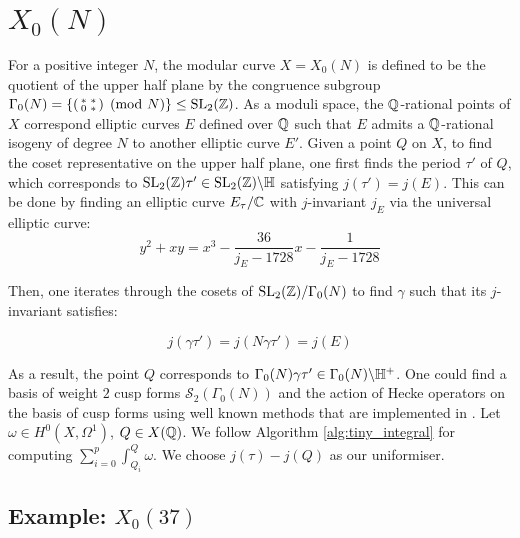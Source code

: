 \section{$X_0(N)$}\label{sec:X_0_N}

For a positive integer $N$, the modular curve $X = X_0(N)$ is defined to be the quotient of the upper half plane by the congruence subgroup $\Gamma_0(N) = \{ \begin{psmallmatrix} \ast & \ast \\ 0 & \ast \end{psmallmatrix} \pmod{N} \} \leq \operatorname{SL}_2(\mathbb{Z})$. As a moduli space, the $\mathbb{Q}$-rational points of $X$ correspond elliptic curves $E$ defined over $\mathbb{Q}$ such that $E$ admits a $\mathbb{Q}$-rational isogeny of degree $N$ to another elliptic curve $E'$. Given a point $Q$ on $X$, to find the coset representative on the upper half plane, one first finds the period $\tau'$ of $Q$, which corresponds to $\operatorname{SL}_2(\mathbb{Z}) \tau' \in \operatorname{SL}_2(\mathbb{Z})\backslash \mathbb{H}$ satisfying $j(\tau') = j(E)$. This can be done by finding an elliptic curve $E_{\tau}/\mathbb{C}$ with $j$-invariant $j_E$ via the universal elliptic curve: \[
y^2 + xy = x^3 - \frac{36}{j_E -1728}x - \frac{1}{j_E - 1728}
\]

Then, one iterates through the cosets of $\operatorname{SL}_2(\mathbb{Z})/\Gamma_0(N)$ to find $\gamma$ such that its $j$-invariant satisfies:

\[
j(\gamma \tau') = j( N\gamma \tau') = j(E)
\]

As a result, the point $Q$ corresponds to $\Gamma_0(N) \gamma \tau' \in \Gamma_0(N) \backslash \mathbb{H}^+$. One could find a basis of weight $2$ cusp forms $\mathcal{S}_2(\Gamma_0(N))$ and the action of Hecke operators on the basis of cusp forms using well known methods that are implemented in \SageMath \cite{steinmf,sagemath}. Let $\omega \in H^0(X,\Omega^1)$, $Q \in X(\mathbb{Q})$. We follow Algorithm \ref{alg:tiny_integral} for computing $\sum_{i=0}^{p}\int^Q_{Q_i} \omega$. We choose $j(\tau)-j(Q)$ as our uniformiser.

\subsection{Example: $X_0(37)$}

